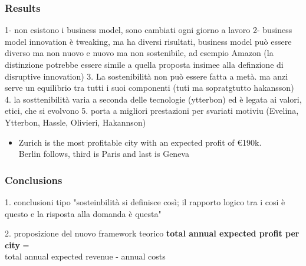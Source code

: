 \documentclass{beamer}
\begin{document}
\begin{frame}
  \frametitle{Results} %
1- non esistono i business model, sono cambiati ogni giorno a lavoro
2- business model innovation è tweaking, ma ha diversi risultati, business  model può essere diverso ma non nuovo e nuovo ma non sostenibile, ad esempio Amazon (la distinzione potrebbe essere simile a quella proposta insimee alla definzione di disruptive innovation)
3. La sostenibilità non può essere fatta a metà. ma anzi serve un equilibrio tra tutti i suoi componenti (tuti ma sopratgtutto hakansson)
4. la sosttenibilità varia a seconda delle tecnologie (ytterbon) ed è legata ai valori, etici, che si evolvono
5. porta a migliori prestazioni per svariati motiviu (Evelina, Ytterbon, Hassle, Olivieri, Hakannson)
  \begin{itemize}
    \item Zurich is the most profitable city with an expected profit of €190k.\\
    Berlin follows, third is Paris and last is Geneva
  \end{itemize}
\end{frame}

\begin{frame}
  \frametitle{Conclusions} %

  1. conclusioni tipo "sosteinbilità si definisce così; il rapporto logico tra i cosi è questo e la risposta alla domanda è questa"

  2. proposizione del nuovo framework teorico 
 \textbf{total annual expected profit per city} = \\
 total annual expected revenue - annual costs \\
\end{frame}
\end{document}
